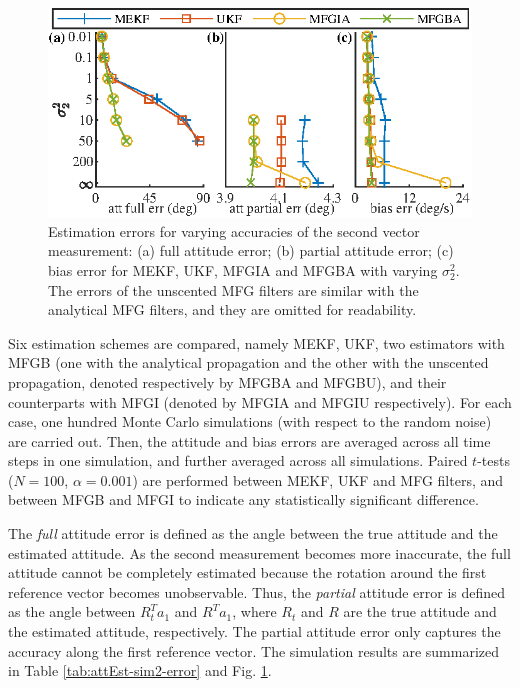 \begin{figure}
	\centering
	\includegraphics[scale=1.4]{figures/attEst-sim2-error}
	\caption{Estimation errors for varying accuracies of the second vector measurement: (a) full attitude error; (b) partial attitude error; (c) bias error for MEKF, UKF, MFGIA and MFGBA with varying $\sigma_2^2$.
		The errors of the unscented MFG filters are similar with the analytical MFG filters, and they are omitted for readability. \label{fig:attEst-sim2-error}}
\end{figure}

Six estimation schemes are compared, namely MEKF, UKF, two estimators with MFGB (one with the analytical propagation and the other with the unscented propagation, denoted respectively by MFGBA and MFGBU), and their counterparts with MFGI (denoted by MFGIA and MFGIU respectively).
For each case, one hundred Monte Carlo simulations (with respect to the random noise) are carried out.
Then, the attitude and bias errors are averaged across all time steps in one simulation, and further averaged across all simulations.
Paired $t$-tests ($N=100$, $\alpha=0.001$) are performed between MEKF, UKF and MFG filters, and between MFGB and MFGI to indicate any statistically significant difference.

The \textit{full} attitude error is defined as the angle between the true attitude and the estimated attitude.
As the second measurement becomes more inaccurate, the full attitude cannot be completely estimated because the rotation around the first reference vector becomes unobservable.
Thus, the \textit{partial} attitude error is defined as the angle between $R^T_t a_1$ and $R^Ta_1$, where $R_t$ and $R$ are the true attitude and the estimated attitude, respectively.
The partial attitude error only captures the accuracy along the first reference vector.
The simulation results are summarized in Table \ref{tab:attEst-sim2-error} and Fig. \ref{fig:attEst-sim2-error}.

